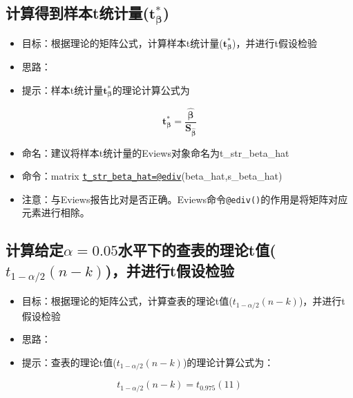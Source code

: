 \documentclass[12pt,(landscape,a4paper),(portrait,a4paper)]{article}
\providecommand{\tightlist}{%
  \setlength{\itemsep}{0pt}\setlength{\parskip}{0pt}}
\begin{document}
\hypertarget{tmathbftast_beta}{%
\subsection{\texorpdfstring{计算得到样本t统计量(\(\mathbf{t^{\ast}_{\beta}}\))}{计算得到样本t统计量(\textbackslash{}mathbf\{t\^{}\{\textbackslash{}ast\}\_\{\textbackslash{}beta\}\})}}\label{tmathbftast_beta}}

\begin{itemize}
\tightlist
\item
  目标：根据理论的矩阵公式，计算样本t统计量(\(\mathbf{t^{\ast}_{\beta}}\))，并进行t假设检验
\item
  思路：
\item
  提示：样本t统计量\(\mathbf{t^{\ast}_{\beta}}\)的理论计算公式为
\end{itemize}

\[\mathbf{t^{\ast}_{\beta}=\frac{\hat{\beta}}{S_{\hat{\beta}}}}\]

\begin{itemize}
\tightlist
\item
  命名：建议将样本t统计量的Eviews对象命名为t\_str\_beta\_hat\\
\item
  命令：matrix
  \href{mailto:t_str_beta_hat=@ediv}{\nolinkurl{t\_str\_beta\_hat=@ediv}}(beta\_hat,s\_beta\_hat)
\item
  注意：与Eviews报告比对是否正确。Eviews命令\texttt{@ediv()}的作用是将矩阵对应元素进行相除。
\end{itemize}

\hypertarget{alpha0.05tt_1-alpha2n-kt}{%
\subsection{\texorpdfstring{计算给定\(\alpha=0.05\)水平下的查表的理论t值(\(t_{1-\alpha/2}(n-k)\))，并进行t假设检验}{计算给定\textbackslash{}alpha=0.05水平下的查表的理论t值(t\_\{1-\textbackslash{}alpha/2\}(n-k))，并进行t假设检验}}\label{alpha0.05tt_1-alpha2n-kt}}

\begin{itemize}
\tightlist
\item
  目标：根据理论的矩阵公式，计算查表的理论t值(\(t_{1-\alpha/2}(n-k)\))，并进行t假设检验
\item
  思路：
\item
  提示：查表的理论t值(\(t_{1-\alpha/2}(n-k)\))的理论计算公式为：
\end{itemize}

\[t_{1-\alpha/2}(n-k)=t_{0.975}(11)\]
\end{document}
